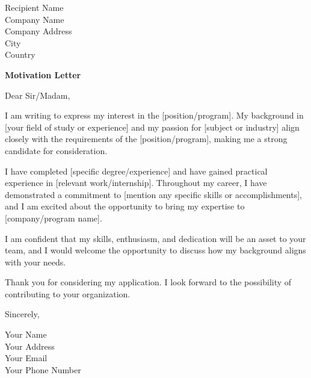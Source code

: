 \documentclass[a4paper,14pt]{letter}
\begin{document}
\date{October 6, 2024}
\begin{letter}{Recipient Name \\ Company Name \\ Company Address \\ City \\ Country}

\vspace*{-6cm}
\begin{center}
    \LARGE \textbf{Motivation Letter}
\end{center}

\vspace{0.2cm} %

\opening{Dear Sir/Madam,}

I am writing to express my interest in the [position/program]. My background in [your field of study or experience] and my passion for [subject or industry] align closely with the requirements of the [position/program], making me a strong candidate for consideration.

I have completed [specific degree/experience] and have gained practical experience in [relevant work/internship]. Throughout my career, I have demonstrated a commitment to [mention any specific skills or accomplishments], and I am excited about the opportunity to bring my expertise to [company/program name].

I am confident that my skills, enthusiasm, and dedication will be an asset to your team, and I would welcome the opportunity to discuss how my background aligns with your needs.

Thank you for considering my application. I look forward to the possibility of contributing to your organization.

\closing{Sincerely,}

\begin{flushright}
Your Name \\
Your Address \\
Your Email \\
Your Phone Number
\end{flushright}

\end{letter}
\end{document}
